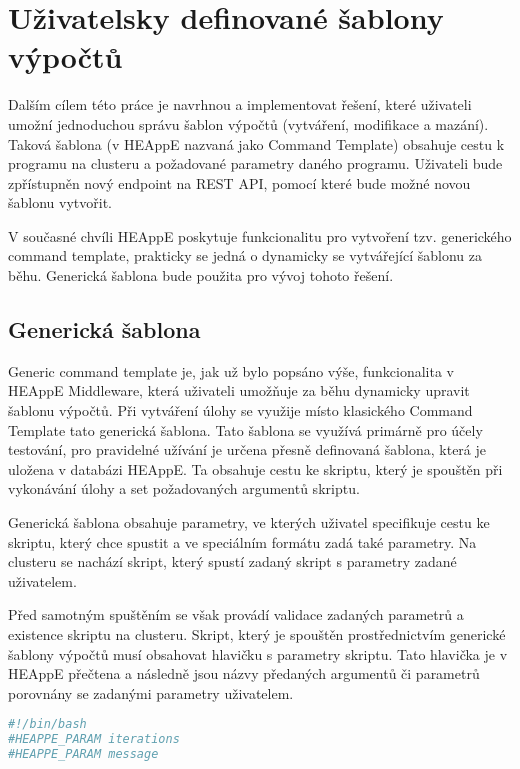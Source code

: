 \chapter{Uživatelsky definované šablony výpočtů}
Dalším cílem této práce je navrhnou a implementovat řešení, které uživateli umožní jednoduchou správu šablon výpočtů (vytváření, modifikace a mazání). Taková šablona (v HEAppE nazvaná jako Command Template) obsahuje cestu k programu na clusteru a požadované parametry daného programu. Uživateli bude zpřístupněn nový endpoint na REST API, pomocí které bude možné novou šablonu vytvořit.

V současné chvíli HEAppE poskytuje funkcionalitu pro vytvoření tzv. generického command template, prakticky se jedná o dynamicky se vytvářející šablonu za běhu. Generická šablona bude použita pro vývoj tohoto řešení.

\section{Generická šablona}
Generic command template je, jak už bylo popsáno výše, funkcionalita v HEAppE Middleware, která uživateli umožňuje za běhu dynamicky upravit šablonu výpočtů. Při vytváření úlohy se využije místo klasického Command Template tato generická šablona. Tato šablona se využívá primárně pro účely testování, pro pravidelné užívání je určena přesně definovaná šablona, která je uložena v databázi HEAppE. Ta obsahuje cestu ke skriptu, který je spouštěn při vykonávání úlohy a set požadovaných argumentů skriptu.

Generická šablona obsahuje parametry, ve kterých uživatel specifikuje cestu ke skriptu, který chce spustit a ve speciálním formátu zadá také parametry. Na clusteru se nachází skript, který spustí zadaný skript s parametry zadané uživatelem.

Před samotným spuštěním se však provádí validace zadaných parametrů a existence skriptu na clusteru. Skript, který je spouštěn prostřednictvím generické šablony výpočtů musí obsahovat hlavičku s parametry skriptu. Tato hlavička je v HEAppE přečtena a následně jsou názvy předaných argumentů či parametrů porovnány se zadanými parametry uživatelem.

\newpage
\begin{lstlisting}[language=bash,caption={Ukázková hlavička skriptu s „generickými" parametry iterations a message}]
#!/bin/bash
#HEAPPE_PARAM iterations
#HEAPPE_PARAM message
\end{lstlisting}

